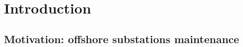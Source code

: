 \documentclass{article}
\begin{document}

\tableofcontents
\section{Introduction}
\label{sec:intro}

\subsection{Motivation: offshore substations maintenance}
\end{document}
